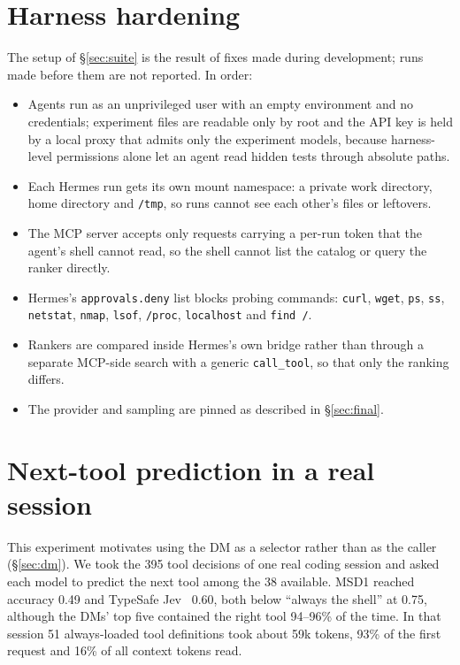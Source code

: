 \documentclass[11pt]{article}
\newcommand{\msd}{MSD1}
\begin{document}
\appendix
\section{Harness hardening}\label{app:hardening}
The setup of \S\ref{sec:suite} is the result of fixes made during development; runs made before them are not
reported. In order:
\begin{itemize}
\item Agents run as an unprivileged user with an empty environment and no credentials; experiment files are
readable only by root and the API key is held by a local proxy that admits only the experiment models, because
harness-level permissions alone let an agent read hidden tests through absolute paths.
\item Each Hermes run gets its own mount namespace: a private work directory, home directory and \texttt{/tmp},
so runs cannot see each other's files or leftovers.
\item The MCP server accepts only requests carrying a per-run token that the agent's shell cannot read, so the
shell cannot list the catalog or query the ranker directly.
\item Hermes's \texttt{approvals.deny} list blocks probing commands: \texttt{curl}, \texttt{wget}, \texttt{ps},
\texttt{ss}, \texttt{netstat}, \texttt{nmap}, \texttt{lsof}, \texttt{/proc}, \texttt{localhost} and
\texttt{find /}.
\item Rankers are compared inside Hermes's own bridge rather than through a separate MCP-side search with a
generic \texttt{call\_tool}, so that only the ranking differs.
\item The provider and sampling are pinned as described in \S\ref{sec:final}.
\end{itemize}

\section{Next-tool prediction in a real session}\label{app:session}
This experiment motivates using the DM as a selector rather than as the caller (\S\ref{sec:dm}). We took the 395
tool decisions of one real coding session and asked each model to predict the next tool among the 38 available.
\msd{} reached accuracy 0.49 and TypeSafe Jev~\citep{typesafejev} 0.60, both below ``always the shell'' at 0.75,
although the DMs' top five contained the right tool 94--96\% of the time. In that session 51 always-loaded tool
definitions took about 59k tokens, 93\% of the first request and 16\% of all context tokens read.
\end{document}
